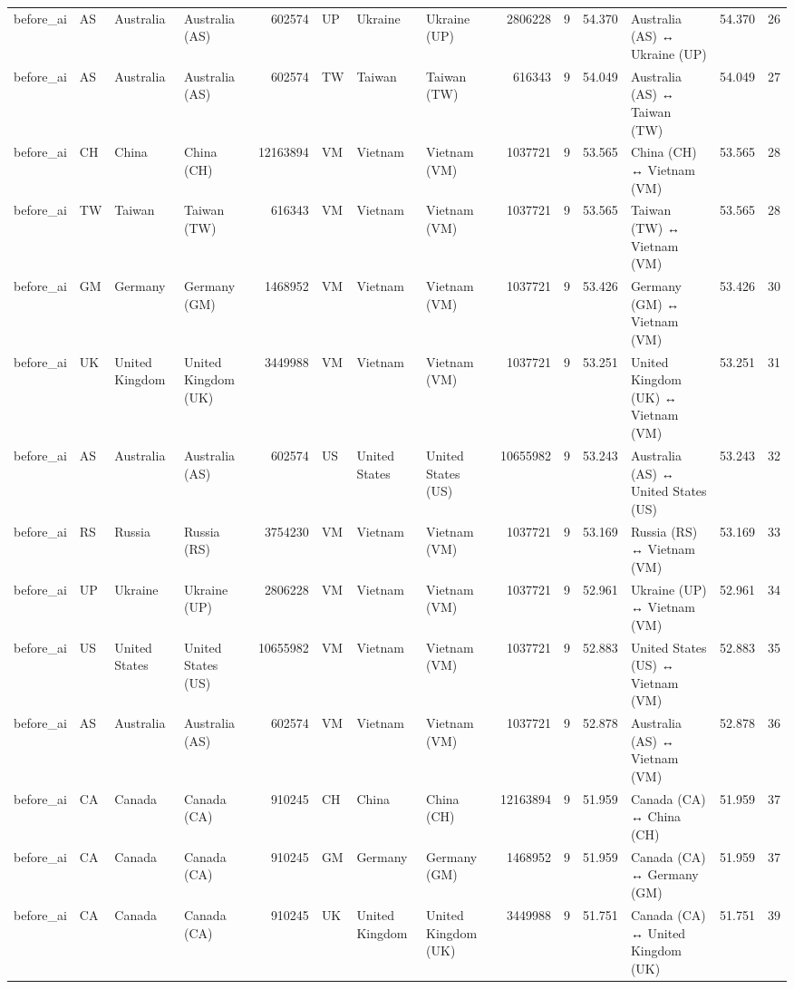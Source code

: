 \begin{tabular}{llllrlllrrrlrr}
before\_ai & AS & Australia & Australia (AS) & 602574 & UP & Ukraine & Ukraine (UP) & 2806228 & 9 & 54.370 & Australia (AS) ↔ Ukraine (UP) & 54.370 & 26 \\
before\_ai & AS & Australia & Australia (AS) & 602574 & TW & Taiwan & Taiwan (TW) & 616343 & 9 & 54.049 & Australia (AS) ↔ Taiwan (TW) & 54.049 & 27 \\
before\_ai & CH & China & China (CH) & 12163894 & VM & Vietnam & Vietnam (VM) & 1037721 & 9 & 53.565 & China (CH) ↔ Vietnam (VM) & 53.565 & 28 \\
before\_ai & TW & Taiwan & Taiwan (TW) & 616343 & VM & Vietnam & Vietnam (VM) & 1037721 & 9 & 53.565 & Taiwan (TW) ↔ Vietnam (VM) & 53.565 & 28 \\
before\_ai & GM & Germany & Germany (GM) & 1468952 & VM & Vietnam & Vietnam (VM) & 1037721 & 9 & 53.426 & Germany (GM) ↔ Vietnam (VM) & 53.426 & 30 \\
before\_ai & UK & United Kingdom & United Kingdom (UK) & 3449988 & VM & Vietnam & Vietnam (VM) & 1037721 & 9 & 53.251 & United Kingdom (UK) ↔ Vietnam (VM) & 53.251 & 31 \\
before\_ai & AS & Australia & Australia (AS) & 602574 & US & United States & United States (US) & 10655982 & 9 & 53.243 & Australia (AS) ↔ United States (US) & 53.243 & 32 \\
before\_ai & RS & Russia & Russia (RS) & 3754230 & VM & Vietnam & Vietnam (VM) & 1037721 & 9 & 53.169 & Russia (RS) ↔ Vietnam (VM) & 53.169 & 33 \\
before\_ai & UP & Ukraine & Ukraine (UP) & 2806228 & VM & Vietnam & Vietnam (VM) & 1037721 & 9 & 52.961 & Ukraine (UP) ↔ Vietnam (VM) & 52.961 & 34 \\
before\_ai & US & United States & United States (US) & 10655982 & VM & Vietnam & Vietnam (VM) & 1037721 & 9 & 52.883 & United States (US) ↔ Vietnam (VM) & 52.883 & 35 \\
before\_ai & AS & Australia & Australia (AS) & 602574 & VM & Vietnam & Vietnam (VM) & 1037721 & 9 & 52.878 & Australia (AS) ↔ Vietnam (VM) & 52.878 & 36 \\
before\_ai & CA & Canada & Canada (CA) & 910245 & CH & China & China (CH) & 12163894 & 9 & 51.959 & Canada (CA) ↔ China (CH) & 51.959 & 37 \\
before\_ai & CA & Canada & Canada (CA) & 910245 & GM & Germany & Germany (GM) & 1468952 & 9 & 51.959 & Canada (CA) ↔ Germany (GM) & 51.959 & 37 \\
before\_ai & CA & Canada & Canada (CA) & 910245 & UK & United Kingdom & United Kingdom (UK) & 3449988 & 9 & 51.751 & Canada (CA) ↔ United Kingdom (UK) & 51.751 & 39 \\

\end{tabular}
